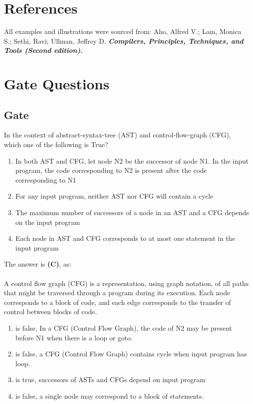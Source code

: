 \documentclass[12pt]{article}
\begin{document}
\section{References}

	All examples and illustrations were sourced from:
	Aho, Alfred V.; Lam, Monica S.; Sethi, Ravi; Ullman, Jeffrey D. \textbf{\emph{Compilers, Principles, Techniques, and Tools (Second edition).}}

\section{Gate Questions}

	\subsection{Gate}
		In the context of abstract-syntax-tree (AST) and control-flow-graph (CFG), which one of the following is True?
		\renewcommand{\labelenumi}{\Alph{enumi}}
		\begin{enumerate}\bfseries
			\item In both AST and CFG, let node N2 be the successor of node N1. In the input program, the code corresponding to N2 is present after the code corresponding to N1
			\item For any input program, neither AST nor CFG will contain a cycle
			\item The maximum number of successors of a node in an AST and a CFG depends on the input program
			\item Each node in AST and CFG corresponds to at most one statement in the input program
		\end{enumerate}

		\newpage

		The answer is \textbf{(C)}, as:\\\\
		A control flow graph (CFG) is a representation, using graph notation, of all paths that might be traversed through a program during its execution. Each node corresponds to a block of code, and each edge corresponds to the transfer of control between blocks of code.
		

		\begin{enumerate}
		\item is false, In a CFG (Control Flow Graph), the code of N2
		may be present before N1 when there is a loop or goto.

		\item is false, a CFG (Control Flow Graph) contains cycle
		when input program has loop.

		\item is true, successors of ASTs and CFGs depend on
		input program

		\item is false, a single node may correspond to a block
		of statements.
		\end{enumerate}
\end{document}
